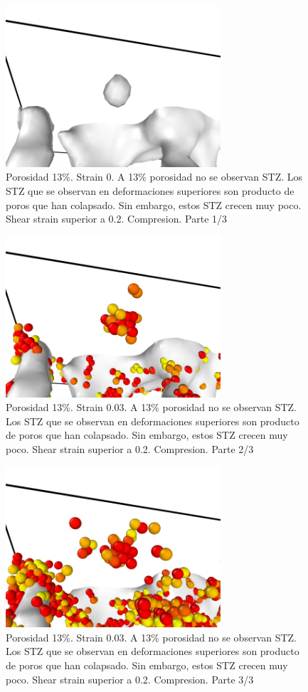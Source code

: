 \documentclass[10pt, oneside]{article} %
\begin{document}
\begin{figure}[H]
\centering
\includegraphics[width=8cm]{Figures/porosidad_13_shearstrain_poro_0.png}
\caption{Porosidad 13\%. Strain 0. A 13\% porosidad no se observan STZ. Los STZ que se observan en deformaciones superiores son producto de poros que han colapsado. Sin embargo, estos STZ crecen muy poco. Shear strain superior a 0.2. Compresion. Parte 1/3}
\end{figure}

\begin{figure}[H]
\centering
\includegraphics[width=8cm]{Figures/porosidad_13_shearstrain_poro_001.png}
\caption{Porosidad 13\%. Strain 0.03. A 13\% porosidad no se observan STZ. Los STZ que se observan en deformaciones superiores son producto de poros que han colapsado. Sin embargo, estos STZ crecen muy poco. Shear strain superior a 0.2. Compresion. Parte 2/3}
\end{figure}

\begin{figure}[H]
\centering
\includegraphics[width=8cm]{Figures/porosidad_13_shearstrain_poro_003.png}
\caption{Porosidad 13\%. Strain 0.03. A 13\% porosidad no se observan STZ. Los STZ que se observan en deformaciones superiores son producto de poros que han colapsado. Sin embargo, estos STZ crecen muy poco. Shear strain superior a 0.2. Compresion. Parte 3/3}
\end{figure}
\end{document}
